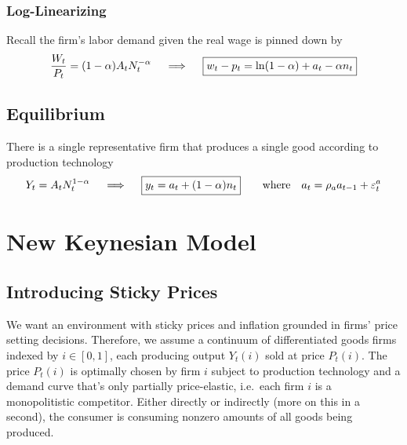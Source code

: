 \documentclass[12pt]{article}
\theoremstyle{plain}
\theoremstyle{definition}
\theoremstyle{remark}
\begin{document}
\subsubsection{Log-Linearizing}

Recall the firm's labor demand given the real wage is pinned down by
\begin{align*}
  \frac{W_t}{P_t} = (1-\alpha)A_t N_t^{-\alpha}
  \quad\implies\quad
  \boxed{%
  w_t - p_t
  = \ln(1-\alpha) + a_t - \alpha n_t
  }
\end{align*}


\clearpage
\subsection{Equilibrium}

        There is a single representative firm that produces a single
        good according to production technology
        \begin{align*}
          Y_t = A_t N_t^{1-\alpha}
          \quad\implies\quad
          \boxed{%
          y_t = a_t + (1-\alpha)n_t
          }
          \qquad\text{where}\quad
          a_t = \rho_a a_{t-1} + \varepsilon_t^a
        \end{align*}



\clearpage
\section{New Keynesian Model}

\subsection{Introducing Sticky Prices}

We want an environment with sticky prices and inflation grounded in
firms' price setting decisions.
Therefore, we assume a continuum of differentiated goods firms
indexed by $i\in[0,1]$, each producing output $Y_t(i)$ sold at
price $P_t(i)$. The price $P_t(i)$ is optimally chosen by firm $i$
subject to production technology and a demand curve that's only
partially price-elastic, i.e.\ each firm $i$ is a monopolitistic
competitor.
Either directly or indirectly (more on this in a second), the consumer
is consuming nonzero amounts of all goods being produced.
\end{document}
